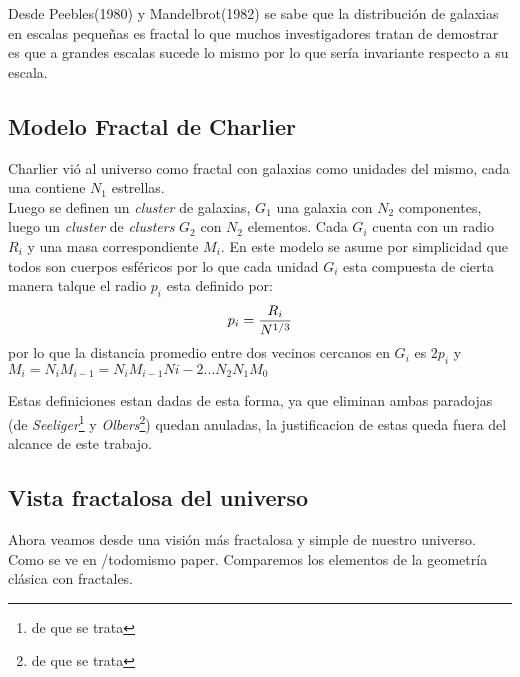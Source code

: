 \documentclass[12tp]{article}
\begin{document}
Desde Peebles(1980) y Mandelbrot(1982) se sabe que la distribución de galaxias en escalas pequeñas es fractal lo que muchos investigadores tratan de 
demostrar es que a grandes escalas sucede lo mismo por lo que sería invariante respecto a su escala.

\subsection{Modelo Fractal de Charlier}
Charlier vió al universo como fractal con galaxias como unidades del mismo, cada una contiene $N_1$ estrellas.\\
Luego se definen un \emph{cluster} de galaxias, $G_1$ una galaxia con $N_2$ componentes, luego un \emph{cluster} de \emph{clusters}
$G_2$ con $N_2$ elementos. Cada $G_i$ cuenta con un radio $R_i$ y una masa correspondiente $M_i$.
En este modelo se asume por simplicidad que todos son cuerpos esféricos por lo que cada unidad $G_i$ esta compuesta de
cierta manera talque el radio $p_i$ esta definido por:
\begin{equation}
    p_i= {{R_i }\over{N^{1/3}}}
\end{equation}
por lo que la distancia promedio entre dos vecinos cercanos en $G_i$ es $2p_i$ y $M_i=N_iM_{i-1}= N_iM_{i-1}N{i-2}...N_2N_1M_0$

Estas definiciones estan dadas de esta forma, ya que eliminan ambas paradojas (de \emph{Seeliger}\footnote{de que se trata} y \emph{Olbers}\footnote{de que se trata}) quedan 
anuladas, la justificacion de estas queda fuera del alcance de este trabajo.
\subsection{Vista fractalosa del universo}

Ahora veamos desde una visión más fractalosa y simple de nuestro universo. Como se ve en /todo{mismo paper}. Comparemos los elementos
de la geometría clásica con fractales.
\end{document}
